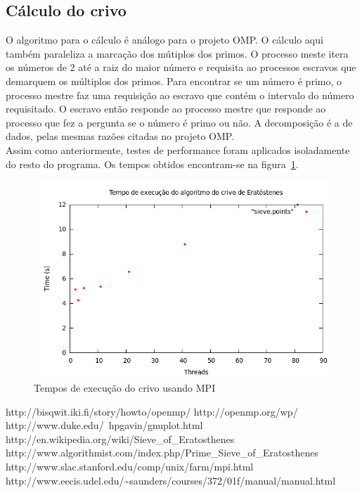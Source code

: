 \documentclass[a4paper]{article}
\begin{document}
\subsection{Cálculo do crivo}
\indent \indent O algoritmo para o cálculo é análogo para o projeto OMP. O cálculo aqui também paraleliza a marcação dos mútiplos dos primos. O processo meste itera os números de 2 até a raiz do maior número e requisita ao processos escravos que demarquem os múltiplos dos primos. Para encontrar se um número é primo, o processo mestre faz uma requisição ao escravo que contém o intervalo do número requisitado. O escravo então responde ao processo mestre que responde ao processo que fez a pergunta se o número é primo ou não. A decomposição é a de dados, pelas mesmas razões citadas no projeto OMP.\\
\indent Assim como anteriormente, testes de performance foram aplicados isoladamente do resto do programa. Os tempos obtidos encontram-se na figura~\ref{graph-sieve-mpi}.
\begin{figure}
	\includegraphics[scale=0.5]{graph-sieve-mpi}
	\caption{Tempos de execução do crivo usando MPI}
	\label{graph-sieve-mpi}
\end{figure}

\newpage
\begin{thebibliography}{99}
	http://bisqwit.iki.fi/story/howto/openmp/
	http://openmp.org/wp/
	http://www.duke.edu/~hpgavin/gnuplot.html
	 http://en.wikipedia.org/wiki/Sieve\_of\_Eratosthenes
	 http://www.algorithmist.com/index.php/Prime\_Sieve\_of\_Eratosthenes
	 http://www.slac.stanford.edu/comp/unix/farm/mpi.html
	 http://www.eecis.udel.edu/\~{}saunders/courses/372/01f/manual/manual.html
\end{thebibliography}
\end{document}
